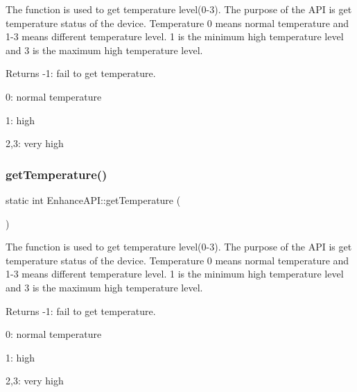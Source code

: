 The function is used to get temperature level(0-\/3). The purpose of the A\+PI is get temperature status of the device. Temperature 0 means normal temperature and 1-\/3 means different temperature level. 1 is the minimum high temperature level and 3 is the maximum high temperature level. 

\begin{DoxyReturn}{Returns}
-\/1\+: fail to get temperature.
\begin{DoxyItemize}
\item 0\+: normal temperature
\item 1\+: high
\item 2,3\+: very high 
\end{DoxyItemize}
\end{DoxyReturn}
\mbox{\label{classEnhanceAPI_a35587d100e1f41c200a75c5368575cc0}} 
\subsubsection{\texorpdfstring{get\+Temperature()}{getTemperature()}\hspace{0.1cm}{\footnotesize\ttfamily [2/2]}}
{\footnotesize\ttfamily static int Enhance\+A\+P\+I\+::get\+Temperature (\begin{DoxyParamCaption}{ }\end{DoxyParamCaption})\hspace{0.3cm}{\ttfamily [static]}}



The function is used to get temperature level(0-\/3). The purpose of the A\+PI is get temperature status of the device. Temperature 0 means normal temperature and 1-\/3 means different temperature level. 1 is the minimum high temperature level and 3 is the maximum high temperature level. 

\begin{DoxyReturn}{Returns}
-\/1\+: fail to get temperature.
\begin{DoxyItemize}
\item 0\+: normal temperature
\item 1\+: high
\item 2,3\+: very high 
\end{DoxyItemize}
\end{DoxyReturn}
\mbox{\label{classEnhanceAPI_a7a0cdc9dde13a4f8545245fe0dd5ddbc}} 
